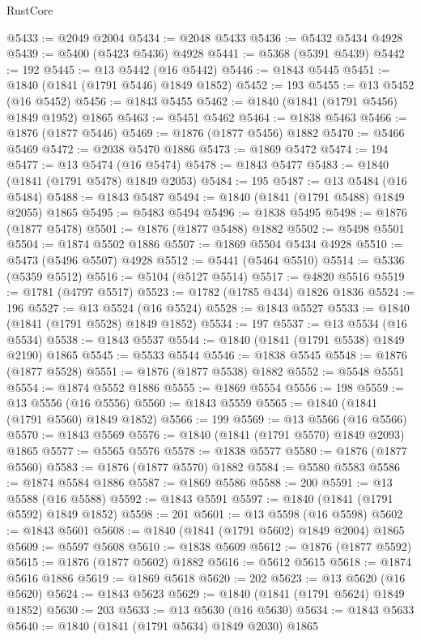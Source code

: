 \begin{lexlean}{RustCore}
\begin{coremodule}
@5433 := @2049 @2004
@5434 := @2048 @5433
@5436 := @5432 @5434 @4928
@5439 := @5400 (@5423 @5436) @4928
@5441 := @5368 (@5391 @5439)
@5442 := 192
@5445 := @13 @5442 (@16 @5442)
@5446 := @1843 @5445
@5451 := @1840 (@1841 (@1791 @5446) @1849 @1852)
@5452 := 193
@5455 := @13 @5452 (@16 @5452)
@5456 := @1843 @5455
@5462 := @1840 (@1841 (@1791 @5456) @1849 @1952) @1865
@5463 := @5451 @5462
@5464 := @1838 @5463
@5466 := @1876 (@1877 @5446)
@5469 := @1876 (@1877 @5456) @1882
@5470 := @5466 @5469
@5472 := @2038 @5470 @1886
@5473 := @1869 @5472
@5474 := 194
@5477 := @13 @5474 (@16 @5474)
@5478 := @1843 @5477
@5483 := @1840 (@1841 (@1791 @5478) @1849 @2053)
@5484 := 195
@5487 := @13 @5484 (@16 @5484)
@5488 := @1843 @5487
@5494 := @1840 (@1841 (@1791 @5488) @1849 @2055) @1865
@5495 := @5483 @5494
@5496 := @1838 @5495
@5498 := @1876 (@1877 @5478)
@5501 := @1876 (@1877 @5488) @1882
@5502 := @5498 @5501
@5504 := @1874 @5502 @1886
@5507 := @1869 @5504 @5434 @4928
@5510 := @5473 (@5496 @5507) @4928
@5512 := @5441 (@5464 @5510)
@5514 := @5336 (@5359 @5512)
@5516 := @5104 (@5127 @5514)
@5517 := @4820 @5516
@5519 := @1781 (@4797 @5517)
@5523 := @1782 (@1785 @434) @1826 @1836
@5524 := 196
@5527 := @13 @5524 (@16 @5524)
@5528 := @1843 @5527
@5533 := @1840 (@1841 (@1791 @5528) @1849 @1852)
@5534 := 197
@5537 := @13 @5534 (@16 @5534)
@5538 := @1843 @5537
@5544 := @1840 (@1841 (@1791 @5538) @1849 @2190) @1865
@5545 := @5533 @5544
@5546 := @1838 @5545
@5548 := @1876 (@1877 @5528)
@5551 := @1876 (@1877 @5538) @1882
@5552 := @5548 @5551
@5554 := @1874 @5552 @1886
@5555 := @1869 @5554
@5556 := 198
@5559 := @13 @5556 (@16 @5556)
@5560 := @1843 @5559
@5565 := @1840 (@1841 (@1791 @5560) @1849 @1852)
@5566 := 199
@5569 := @13 @5566 (@16 @5566)
@5570 := @1843 @5569
@5576 := @1840 (@1841 (@1791 @5570) @1849 @2093) @1865
@5577 := @5565 @5576
@5578 := @1838 @5577
@5580 := @1876 (@1877 @5560)
@5583 := @1876 (@1877 @5570) @1882
@5584 := @5580 @5583
@5586 := @1874 @5584 @1886
@5587 := @1869 @5586
@5588 := 200
@5591 := @13 @5588 (@16 @5588)
@5592 := @1843 @5591
@5597 := @1840 (@1841 (@1791 @5592) @1849 @1852)
@5598 := 201
@5601 := @13 @5598 (@16 @5598)
@5602 := @1843 @5601
@5608 := @1840 (@1841 (@1791 @5602) @1849 @2004) @1865
@5609 := @5597 @5608
@5610 := @1838 @5609
@5612 := @1876 (@1877 @5592)
@5615 := @1876 (@1877 @5602) @1882
@5616 := @5612 @5615
@5618 := @1874 @5616 @1886
@5619 := @1869 @5618
@5620 := 202
@5623 := @13 @5620 (@16 @5620)
@5624 := @1843 @5623
@5629 := @1840 (@1841 (@1791 @5624) @1849 @1852)
@5630 := 203
@5633 := @13 @5630 (@16 @5630)
@5634 := @1843 @5633
@5640 := @1840 (@1841 (@1791 @5634) @1849 @2030) @1865

\end{coremodule}
\end{lexlean}
